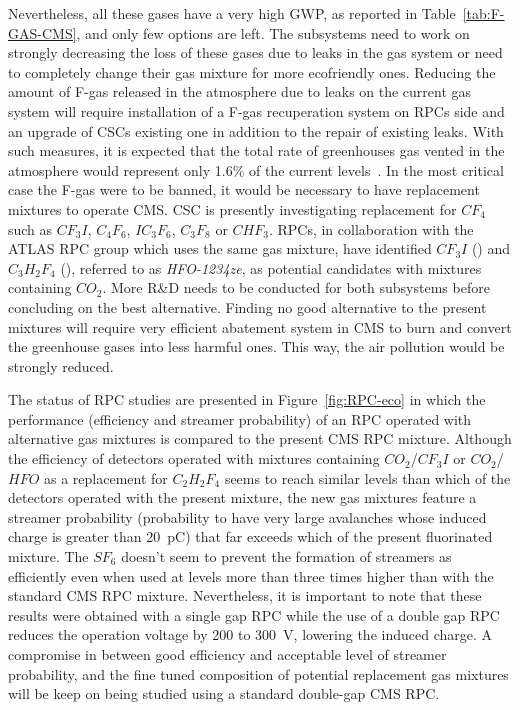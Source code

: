 	Nevertheless, all these gases have a very high GWP, as reported in Table~\ref{tab:F-GAS-CMS}, and only few options are left. The subsystems need to work on strongly decreasing the loss of these gases due to leaks in the gas system or need to completely change their gas mixture for more ecofriendly ones. Reducing the amount of F-gas released in the atmosphere due to leaks on the current gas system will require installation of a F-gas recuperation system on RPCs side and an upgrade of CSCs existing one in addition to the repair of existing leaks. With such measures, it is expected that the total rate of greenhouses gas vented in the atmosphere would represent only 1.6\% of the current levels~\cite{PHASEIITP}. In the most critical case the F-gas were to be banned, it would be necessary to have replacement mixtures to operate CMS. CSC is presently investigating replacement for $CF_4$ such as $CF_3I$, $C_4F_6$, $IC_3F_6$, $C_3F_8$ or $CHF_3$. RPCs, in collaboration with the ATLAS RPC group which uses the same gas mixture, have identified $CF_3I$ () and $C_3H_2F_4$ (), referred to as \textit{HFO-1234ze}, as potential candidates with mixtures containing $CO_2$. More R\&D needs to be conducted for both subsystems before concluding on the best alternative. Finding no good alternative to the present mixtures will require very efficient abatement system in CMS to burn and convert the greenhouse gases into less harmful ones. This way, the air pollution would be strongly reduced.
	
	The status of RPC studies are presented in Figure~\ref{fig:RPC-eco} in which the performance (efficiency and streamer probability) of an RPC operated with alternative gas mixtures is compared to the present CMS RPC mixture. Although the efficiency of detectors operated with mixtures containing $CO_2$/$CF_3I$ or $CO_2$/$HFO$ as a replacement for $C_2H_2F_4$ seems to reach similar levels than which of the detectors operated with the present mixture, the new gas mixtures feature a streamer probability (probability to have very large avalanches whose induced charge is greater than \SI{20}{pC}) that far exceeds which of the present fluorinated mixture. The $SF_6$ doesn't seem to prevent the formation of streamers as efficiently even when used at levels more than three times higher than with the standard CMS RPC mixture. Nevertheless, it is important to note that these results were obtained with a single gap RPC while the use of a double gap RPC reduces the operation voltage by 200 to \SI{300}{V}, lowering the induced charge. A compromise in between good efficiency and acceptable level of streamer probability, and the fine tuned composition of potential replacement gas mixtures will be keep on being studied using a standard double-gap CMS RPC.
	
